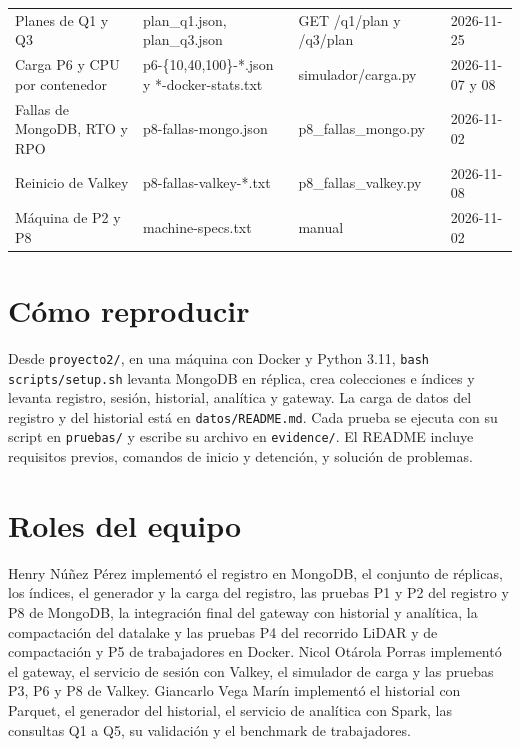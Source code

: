 \documentclass[conference]{IEEEtran}
\begin{document}
\begin{table}[!t]
\begin{tabularx}{\textwidth}{@{}X l l l@{}}
Planes de Q1 y Q3 & plan\_q1.json, plan\_q3.json & GET /q1/plan y /q3/plan & 2026-11-25 \\
Carga P6 y CPU por contenedor & p6-\{10,40,100\}-*.json y *-docker-stats.txt & simulador/carga.py & 2026-11-07 y 08 \\
Fallas de MongoDB, RTO y RPO & p8-fallas-mongo.json & p8\_fallas\_mongo.py & 2026-11-02 \\
Reinicio de Valkey & p8-fallas-valkey-*.txt & p8\_fallas\_valkey.py & 2026-11-08 \\
Máquina de P2 y P8 & machine-specs.txt & manual & 2026-11-02 \\
\bottomrule
\end{tabularx}
\end{table}

\section{Cómo reproducir}

Desde \texttt{proyecto2/}, en una máquina con Docker y Python 3.11, \texttt{bash scripts/setup.sh} levanta MongoDB en réplica, crea colecciones e índices y levanta registro, sesión, historial, analítica y gateway. La carga de datos del registro y del historial está en \texttt{datos/README.md}. Cada prueba se ejecuta con su script en \texttt{pruebas/} y escribe su archivo en \texttt{evidence/}. El README incluye requisitos previos, comandos de inicio y detención, y solución de problemas.

\section{Roles del equipo}

Henry Núñez Pérez implementó el registro en MongoDB, el conjunto de réplicas, los índices, el generador y la carga del registro, las pruebas P1 y P2 del registro y P8 de MongoDB, la integración final del gateway con historial y analítica, la compactación del datalake y las pruebas P4 del recorrido LiDAR y de compactación y P5 de trabajadores en Docker. Nicol Otárola Porras implementó el gateway, el servicio de sesión con Valkey, el simulador de carga y las pruebas P3, P6 y P8 de Valkey. Giancarlo Vega Marín implementó el historial con Parquet, el generador del historial, el servicio de analítica con Spark, las consultas Q1 a Q5, su validación y el benchmark de trabajadores.
\end{document}
